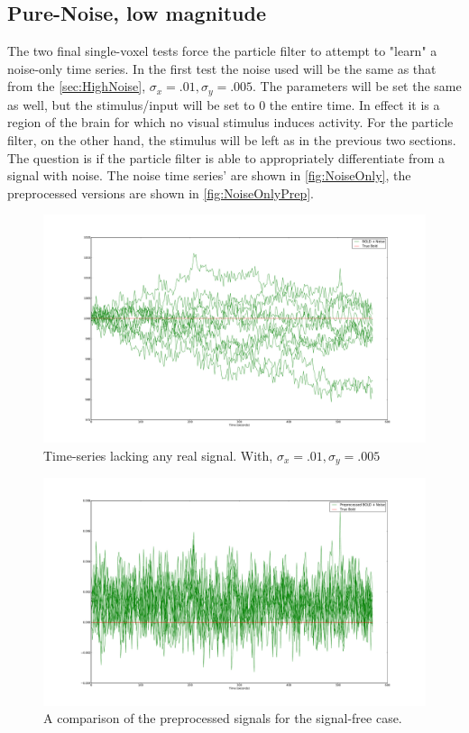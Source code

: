\subsection{Pure-Noise, low magnitude}
The two final single-voxel tests force the particle filter to attempt to "learn" a noise-only
time series. In the first test the noise used will be the same as that from the \autoref{sec:HighNoise},
$\sigma_x = .01, \sigma_y = .005$. The parameters will be set the same as well, but the
stimulus/input will be set to 0 the entire time. In effect it is a region of the brain for
which no visual stimulus induces activity. For the particle filter, on the other hand,
the stimulus will be left as in the previous two sections. The question is if the particle
filter is able to appropriately differentiate from a signal with noise. The noise time series'
are shown in \autoref{fig:NoiseOnly}, the preprocessed versions are shown in \autoref{fig:NoiseOnlyPrep}.
\begin{figure}[H]
\includegraphics[clip=true,trim=6cm 3cm 6cm 3cm,width=16cm]{images/realization_noiseonly}
\caption{Time-series lacking any real signal. With, $\sigma_x = .01, \sigma_y=.005$}
\label{fig:NoiseOnly}
\end{figure}
\begin{figure}[H]
\includegraphics[clip=true,trim=6cm 3cm 6cm 3cm,width=16cm]{images/preprocessed_noiseonly}
\caption{A comparison of the preprocessed signals for the signal-free case.}
\label{fig:PreprocessedNoiseOnly}
\end{figure}

